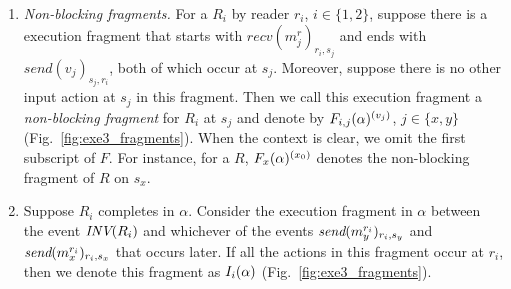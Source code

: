 \begin{enumerate}[leftmargin=*]
%
%
\item \emph{Non-blocking fragments.}
 For a \rot{} $R_i$ by reader $r_i$, $i\in \{1, 2\}$, suppose there is a execution fragment that starts with $recv(m_j^r)_{r_i, s_j}$ and ends with
 $send(v_j)_{s_j, r_i}$, both of which  occur  at $s_j$. Moreover, suppose there is  
 no other input action at $s_j$ in this fragment. Then we call this execution fragment 
   a \emph{non-blocking fragment} for $R_i$ at  $s_j$ and denote by $\frage{F_{i,j}}{\alpha}{v_j}$, $j \in \{x, y\}$(Fig.~\ref{fig:exe3_fragments}).
%
   When the context is clear, we omit the first subscript of $F$. For instance, for a \rot{} $R$, $\frage{F_{x}}{\alpha}{x_0}$ denotes the non-blocking fragment of $R$ on $s_x$.  

%
%
\item Suppose \rot{} $R_i$ completes in $\alpha$. Consider the execution fragment in $\alpha$  between the event 
${\textit{INV}(R_i)}$  and  whichever of the events  ${\textit{send}(m_y^{r_i})_{r_i, s_y}}$ and  ${\textit{send}(m_x^{r_i})_{r_i, s_x}}$ that occurs later. If all the 
actions in this fragment occur at  $r_i$, then we denote this fragment as $\frage{I_i}{\alpha}{}$ (Fig.~\ref{fig:exe3_fragments}).  


\end{enumerate}
